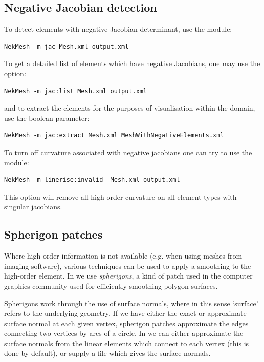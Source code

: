 \subsection{Negative Jacobian detection}

To detect elements with negative Jacobian determinant, use the 
module:
%
\begin{lstlisting}[style=BashInputStyle]
NekMesh -m jac Mesh.xml output.xml
\end{lstlisting}
%
To get a detailed list of elements which have negative Jacobians, one may use
the  option:
%
\begin{lstlisting}[style=BashInputStyle]
NekMesh -m jac:list Mesh.xml output.xml
\end{lstlisting}
%
and to extract the elements for the purposes of visualisation within the domain,
use the  boolean parameter:
%
\begin{lstlisting}[style=BashInputStyle]
NekMesh -m jac:extract Mesh.xml MeshWithNegativeElements.xml
\end{lstlisting}

To turn off curvature associated with negative jacobians one can try to use the
 module:
\begin{lstlisting}[style=BashInputStyle]
NekMesh -m linerise:invalid  Mesh.xml output.xml
\end{lstlisting}
This option will remove all high order curvature on all element types
with singular jacobians.

\subsection{Spherigon patches}

Where high-order information is not available (e.g. when using meshes from
imaging software), various techniques can be used to apply a smoothing to the
high-order element. In \nm we use \emph{spherigons}, a kind of patch used in the
computer graphics community used for efficiently smoothing polygon surfaces.

Spherigons work through the use of surface normals, where in this sense
`surface' refers to the underlying geometry. If we have either the exact or
approximate surface normal at each given vertex, spherigon patches approximate
the edges connecting two vertices by arcs of a circle. In \nm we can either
approximate the surface normals from the linear elements which connect to each
vertex (this is done by default), or supply a file which gives the surface
normals.

